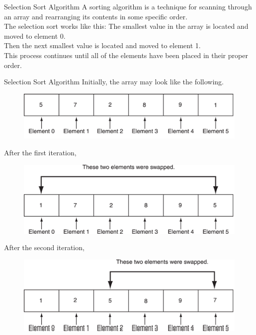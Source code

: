 \documentclass[11pt]{beamer}
\begin{document}
\begin{frame}{Selection Sort Algorithm}
    A sorting algorithm is a technique for scanning through an array and rearranging its contents in some specific order. \\ \vspace{1em} 
    The selection sort works like this: The smallest value in the array is located and moved to element 0. \\ \vspace{1em} 
    Then the next smallest value is located and moved to element 1. \\ \vspace{1em} 
    This process continues until all of the elements have been placed in their proper order.
\end{frame}

\begin{frame}{Selection Sort Algorithm}
    Initially, the array may look like the following.
    \noindent 
    \begin{figure}[H]
    \centering
    \includegraphics[scale=0.5]{Images/chapter07_section11_SortAlgorithm.png}
    \end{figure}
    After the first iteration,
    \noindent 
    \begin{figure}[H]
    \centering
    \includegraphics[scale=0.5]{Images/chapter07_section11_SortAlgorithm02.png}
    \end{figure}
    After the second iteration,
    \noindent 
    \begin{figure}[H]
    \centering
    \includegraphics[scale=0.5]{Images/chapter07_section11_SortAlgorithm03.png}
    \end{figure}
\end{frame}
\end{document}
